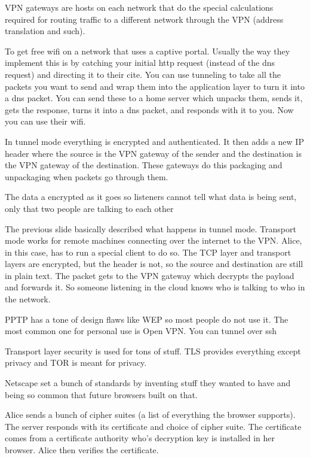\documentclass{article}
\begin{document}

VPN gateways are hosts on each network that do the special calculations required for routing traffic to a different network through the VPN (address translation and such). 


To get free wifi on a network that uses a captive portal. Usually the way they implement this is by catching your initial http request (instead of the dns request) and directing it to their cite. You can use tunneling to take all the packets you want to send and wrap them into the application layer to turn it into a dns packet. You can send these to a home server which unpacks them, sends it, gets the response, turns it into a dns packet, and responds with it to you. Now you can use their wifi.

In tunnel mode everything is encrypted and authenticated. It then adds a new IP header where the source is the VPN gateway of the sender and the destination is the VPN gateway of the destination. These gateways do this packaging and unpackaging when packets go through them. 

The data a encrypted as it goes so listeners cannot tell what data is being sent, only that two people are talking to each other


The previous slide basically described what happens in tunnel mode. Transport mode works for remote machines connecting over the internet to the VPN. Alice, in this case, has to run a special client to do so. The TCP layer and transport layers are encrypted, but the header is not, so the source and destination are still in plain text. The packet gets to the VPN gateway which decrypts the payload and forwards it. So someone listening in the cloud knows who is talking to who in the network.


PPTP has a tone of design flaws like WEP so most people do not use it. The most common one for personal use is Open VPN. You can tunnel over ssh 


Transport layer security is used for tons of stuff. TLS provides everything except privacy and TOR is meant for privacy.


Netscape set a bunch of standards by inventing stuff they wanted to have and being so common that future browsers built on that. 


Alice sends a bunch of cipher suites (a list of everything the browser supports). The server responds with its certificate and choice of cipher suite. The certificate comes from a certificate authority who's decryption key is installed in her browser. Alice then verifies the certificate. 
\end{document}
